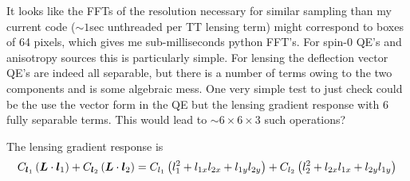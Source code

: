 \documentclass[11pt]{article}
\begin{document}
It looks like the FFTs of the resolution necessary for similar sampling than my current code ($\sim 1 $sec unthreaded per TT lensing term) might correspond to boxes of 64 pixels, which gives me sub-milliseconds python FFT's. 
For spin-0 QE's and anisotropy sources this is particularly simple. For lensing the deflection vector QE's are indeed all separable, but there is a number of terms owing to the two components and is some algebraic mess. One very simple test to just check could be the use the vector form in the QE but the lensing gradient response with 6 fully separable terms. This would lead to $\sim 6 \times 6 \times 3$ such operations?

The lensing gradient response is
\begin{equation}
	C_{\boldsymbol{l}_1} \left( \boldsymbol{L} \cdot \boldsymbol{l}_1 \right) + C_{\boldsymbol{l}_2} \left( \boldsymbol{L} \cdot \boldsymbol{l}_2 \right) = C_{l_1}\left( l_1^2  + l_{1x} l_{2x} + l_{1y} l_{2y}\right) + C_{l_2}\left( l_2^2  + l_{2x} l_{1x} + l_{2y} l_{1y}\right)
\end{equation}
\end{document}
